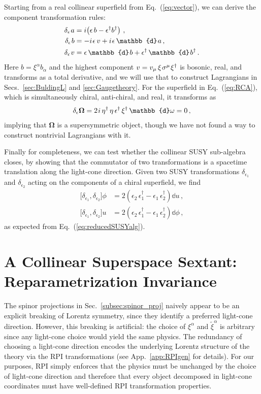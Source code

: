 \documentclass[12pt,document,nofootinbib,superscriptaddress,onecolumn,preprintnumbers,balancelastpage]{article}
\newcommand{\s}{\hspace{0.8pt}}
\newcommand{\PP}{\mathbb{d}}
\DeclareRobustCommand{\Sec}[1]{Sec.~\ref{#1}}
\DeclareRobustCommand{\Secs}[2]{Secs.~\ref{#1} and \ref{#2}}
\DeclareRobustCommand{\App}[1]{App.~\ref{#1}}
\DeclareRobustCommand{\Eq}[1]{Eq.~(\ref{#1})}
\newcommand{\RCA}{\boldsymbol{\Omega}}
\begin{document}
\begin{spacing}{1.2}
Starting from a real collinear superfield from \Eq{eq:vector}, we can derive the component transformation rules:  
%
\begin{align}
\delta_\epsilon\s a &= i\! \left( \epsilon \, b - \epsilon^\dagger b^\dagger  \right)\,,  \nonumber \\
\delta_\epsilon\s b &=  - i\s \epsilon \, v + i\s \epsilon\, \PP\s a\, ,\nonumber \\
\delta_\epsilon\s v &=\epsilon\, \PP\s b + \epsilon^\dagger\, \PP\s b^\dagger\, .
\label{eq:componentshift_vector}
\end{align}
%
Here $b = \xi^\alpha b_\alpha$ and the highest component $v= v_\mu\,\xi\s \sigma^\mu\s \xi^\dagger$ is bosonic, real, and transforms as a total derivative, and we will use that to construct Lagrangians in \Secs{sec:BuldingL}{sec:Gaugetheory}.
%
For the superfield in \Eq{eq:RCA}, which is simultaneously chiral, anti-chiral, and real, it transforms as
\begin{align}
\delta_\epsilon \RCA = 2\s i\, \eta^\dagger\, \eta\, \epsilon^\dagger \,\xi^\dagger\, \PP \omega = 0\,,
\end{align}
implying that $\RCA$ is a supersymmetric object, though we have not found a way to construct nontrivial Lagrangians with it.


Finally for completeness, we can test whether the collinear SUSY sub-algebra closes, by showing that the commutator of two transformations is a spacetime translation along the light-cone direction.
%
Given two SUSY transformations $\delta_{\epsilon_1}$ and $\delta_{\epsilon_2}$ acting on the components of a chiral superfield, we find
\begin{align}
\Big[ \delta_{\epsilon_1}, \delta_{\epsilon_2} \Big] \phi &= 2  \left( \epsilon_2\, \epsilon^{\dagger}_{1} -  \epsilon_1\, \epsilon^{\dagger}_{2}\right) \PP u\,, \nonumber\\
\Big[ \delta_{\epsilon_1}, \delta_{\epsilon_2} \Big] u & =  2  \left( \epsilon_2\, \epsilon^{\dagger}_{1} -  \epsilon_1\, \epsilon^{\dagger}_{2}\right) \PP \phi \,,
\end{align}
as expected from \Eq{eq:reducedSUSYalg}.

\section{A Collinear Superspace Sextant: Reparametrization Invariance}
\label{sec:RPI}

The spinor projections in \Sec{subsec:spinor_proj} naively appear to be an explicit breaking of Lorentz symmetry, since they identify a preferred light-cone direction.
%
However, this breaking is artificial:  the choice of $\xi^\alpha$ and $\tilde{\xi}^\alpha$ is arbitrary since any light-cone choice would yield the same physics.
%
The redundancy of choosing a light-cone direction encodes the underlying Lorentz structure of the theory via the RPI transformations (see \App{app:RPIgen} for details).
%
For our purposes, RPI simply enforces that the physics must be unchanged by the choice of light-cone direction and therefore that every object decomposed in light-cone coordinates must have well-defined RPI transformation properties. 


\end{spacing}
\end{document}
